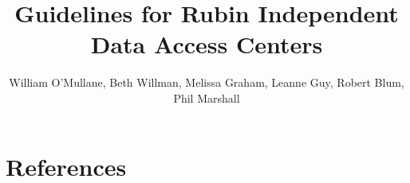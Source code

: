 \documentclass[DM,authoryear,toc]{lsstdoc}
\title[Independent DACs]{Guidelines for Rubin Independent Data Access Centers}
\author   {William O'Mullane, Beth Willman, Melissa Graham, Leanne Guy, Robert Blum, Phil Marshall }
\date{\vcsDate}
\begin{document}
\maketitle

\renewcommand{\thepage}{\arabic{page}}%

\setcounter{page}{1}%



%





\appendix
\section{References} \label{sec:bib}
\renewcommand{\refname}{} %


%
\label{sec:acronyms}
\printglossaries



\end{document}
